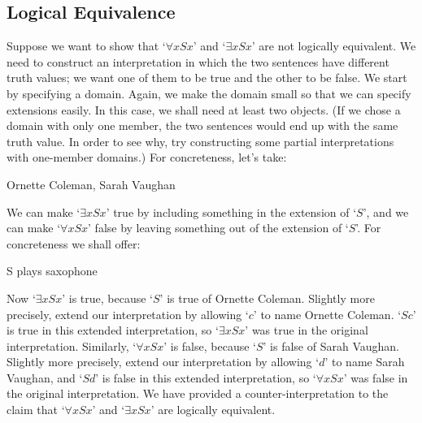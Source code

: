 \begin{earg}
\section{Logical Equivalence}
Suppose we want to show that `$\forall x Sx$' and `$\exists x Sx$' are not logically equivalent. We need to construct an interpretation in which the two sentences have different truth values; we want one of them to be true and the other to be false. We start by specifying a domain. Again, we make the domain small so that we can specify extensions easily. In this case, we shall need at least two objects. (If we chose a domain with only one member, the two sentences would end up with the same truth value. In order to see why, try constructing some partial interpretations with one-member domains.) For concreteness, let's take:
	\begin{ekey}
		\item[\domain] Ornette Coleman, Sarah Vaughan
	\end{ekey}
We can make `$\exists x Sx$' true by including something in the extension of `$S$', and we can make `$\forall x Sx$' false by leaving something out of the extension of `$S$'. For concreteness we shall offer:
	\begin{ekey}
		\item[S]  plays saxophone
	\end{ekey}
Now `$\exists x Sx$' is true, because `$S$' is true of Ornette Coleman. Slightly more precisely, extend our interpretation by allowing `$c$' to name Ornette Coleman.  `$Sc$' is true in this extended interpretation, so `$\exists x Sx$' was true in the original interpretation. Similarly, `$\forall x Sx$' is false, because `$S$' is false of Sarah Vaughan. Slightly more precisely, extend our interpretation by allowing `$d$' to name Sarah Vaughan, and `$Sd$' is false in this extended interpretation, so `$\forall x Sx$' was false in the original interpretation. We have provided a counter-interpretation to the claim that `$\forall x Sx$' and `$\exists x Sx$' are logically equivalent.


\end{earg}
